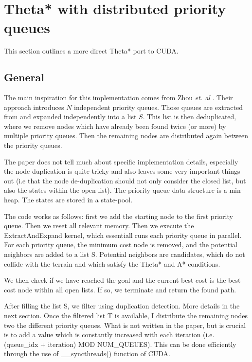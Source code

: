 \documentclass{article}
\begin{document}
\section{Theta* with distributed priority queues}
%
This section outlines a more direct Theta* port to CUDA.
\subsection{General}
%
The main inspiration for this implementation comes from Zhou \textit{et. al} \cite{Zhou15}. Their approach introduces $N$ independent priority queues. Those queues are extracted from and expanded independently into a list $S$. This list is then deduplicated, where we remove nodes which have already been found twice (or more) by multiple priority queues. Then the remaining nodes are distributed again between the priority queues.

The paper does not tell much about specific implementation details, especially the node duplication is quite tricky and also leaves some very important things out (i.e that the node de-duplication should not only consider the closed list, but also the states within the open list). The priority queue data structure is a min-heap. The states are stored in a state-pool.

The code works as follows: first we add the starting node to the first priority queue. Then we reset all relevant memory. Then we execute the ExtractAndExpand kernel, which essentiall runs each priority queue in parallel. For each priority queue, the minimum cost node is removed, and the potential neighbors are added to a list S. Potential neighbors are candidates, which do not collide with the terrain and which satisfy the Theta* and A* conditions.

We then check if we have reached the goal and the current best cost is the best cost node within all open lists. If so, we terminate and return the found path.

After filling the list S, we filter using duplication detection. More details in the next section. Once the filtered list T is available, I distribute the remaining nodes two the different priority queues. What is not written in the paper, but is crucial is to add a value which is constantly increased with each iteration (i.e. (queue\_idx + iteration) MOD NUM\_QUEUES). This can be done efficiently through the use of \_\_syncthreads() function of CUDA.
%
\end{document}
